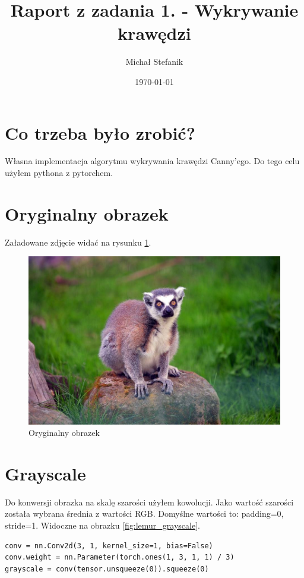 \documentclass[a4paper]{article}
\author{Michał Stefanik}
\date{\today}
\title{Raport z zadania 1. - Wykrywanie krawędzi}
\begin{document}
\maketitle
\section{Co trzeba było zrobić?}

Własna implementacja algorytmu wykrywania krawędzi Canny'ego.
Do tego celu użyłem pythona z pytorchem.

\section{Oryginalny obrazek}

Załadowane zdjęcie widać na rysunku \ref{fig:lemur}.

\begin{figure}[h]
    \centering
    \includegraphics[width=\textwidth]{lemur.jpg}
    \caption{Oryginalny obrazek}
    \label{fig:lemur}
\end{figure}

\section{Grayscale}

Do konwersji obrazka na skalę szarości użyłem kowolucji. Jako wartość
szarości została wybrana średnia z wartości RGB. Domyślne wartości to:
padding=0, stride=1. Widoczne na obrazku \ref{fig:lemur_grayscale}.

\begin{lstlisting}
conv = nn.Conv2d(3, 1, kernel_size=1, bias=False)
conv.weight = nn.Parameter(torch.ones(1, 3, 1, 1) / 3)
grayscale = conv(tensor.unsqueeze(0)).squeeze(0)
\end{lstlisting}
\end{document}
